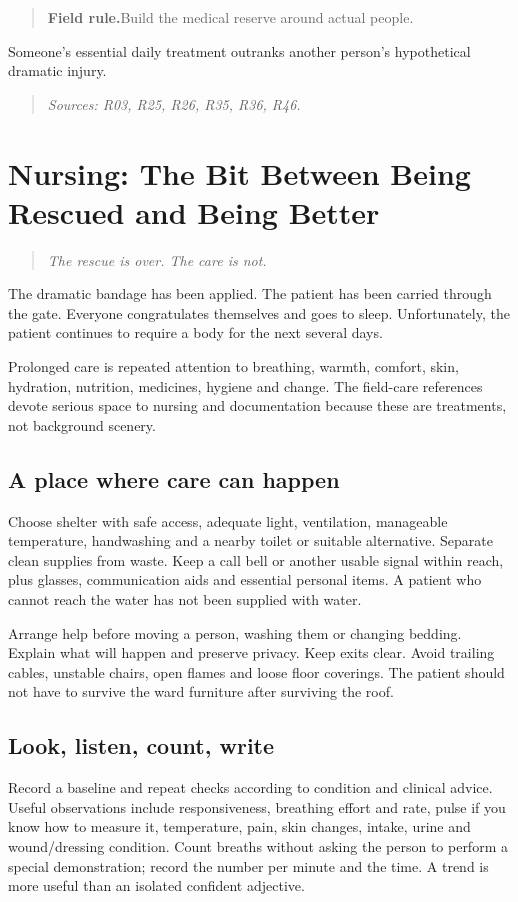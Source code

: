 \documentclass[10pt,openright]{book}
\newcommand{\fieldrule}[1]{\begin{quote}\textbf{Field rule.}\enspace #1\end{quote}}
\begin{document}
\fieldrule{Build the medical reserve around actual people.}
Someone's essential daily treatment outranks another person's hypothetical dramatic injury.

\begin{quote}\emph{Sources: R03, R25, R26, R35, R36, R46.}\end{quote}
\chapter{Nursing: The Bit Between Being Rescued and Being Better}
\begin{quote}\emph{The rescue is over. The care is not.}\end{quote}
The dramatic bandage has been applied. The patient has been carried through the gate. Everyone congratulates themselves and goes to sleep. Unfortunately, the patient continues to require a body for the next several days.

Prolonged care is repeated attention to breathing, warmth, comfort, skin, hydration, nutrition, medicines, hygiene and change. The field-care references devote serious space to nursing and documentation because these are treatments, not background scenery.

\section*{A place where care can happen}
Choose shelter with safe access, adequate light, ventilation, manageable temperature, handwashing and a nearby toilet or suitable alternative. Separate clean supplies from waste. Keep a call bell or another usable signal within reach, plus glasses, communication aids and essential personal items. A patient who cannot reach the water has not been supplied with water.

Arrange help before moving a person, washing them or changing bedding. Explain what will happen and preserve privacy. Keep exits clear. Avoid trailing cables, unstable chairs, open flames and loose floor coverings. The patient should not have to survive the ward furniture after surviving the roof.

\section*{Look, listen, count, write}
Record a baseline and repeat checks according to condition and clinical advice. Useful observations include responsiveness, breathing effort and rate, pulse if you know how to measure it, temperature, pain, skin changes, intake, urine and wound/dressing condition. Count breaths without asking the person to perform a special demonstration; record the number per minute and the time. A trend is more useful than an isolated confident adjective.
\end{document}
